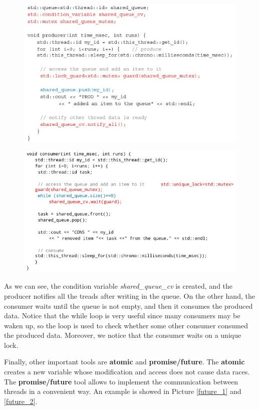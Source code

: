 \begin{figure}[h!]
		\centering
		\includegraphics[scale = 1.4]{img/condition_p.jpg}
        \label{condition_p}
\end{figure}

\begin{figure}[h!]
		\centering
		\includegraphics[scale = 1.4]{img/condition_c.jpg}
        \label{condition_c}
\end{figure}

As we can see, the condition variable \textit{shared\_queue\_cv} is created, and the producer notifies all the treads after writing in the queue. On the other hand, the consumer waits until the queue is not empty, and then it consumes the produced data. Notice that the while loop is very useful since many consumers may be waken up, so the loop is used to check whether some other consumer consumed the produced data. Moreover, we notice that the consumer waits on a unique lock.

Finally, other important tools are \textbf{atomic} and \textbf{promise/future}. The \textbf{atomic} creates a new variable whose modification and access does not cause data races. The \textbf{promise/future} tool allows to implement the communication between threads in a convenient way. An example is showed in Picture \ref{future_1} and \ref{future_2}.

